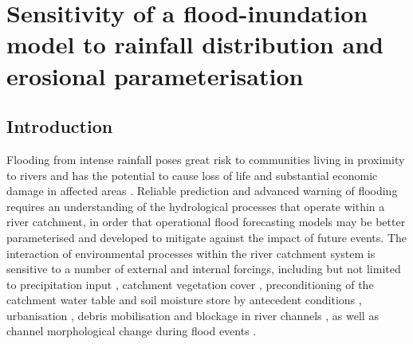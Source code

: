 \chapter{Sensitivity of a flood-inundation model to rainfall distribution and erosional parameterisation}
\label{chapter_flood_model_sensitivity}


%
%
\section{Introduction}

Flooding from intense rainfall poses great risk to communities living in proximity to rivers and has the potential to cause loss of life and substantial economic damage in affected areas \citep{pitt2008pitt}. Reliable prediction and advanced warning of flooding requires an understanding of the hydrological processes that operate within a river catchment, in order that operational flood forecasting models may be better parameterised and developed to mitigate against the impact of future events. The interaction of environmental processes within the river catchment system is sensitive to a number of external and internal forcings, including but not limited to precipitation input \citep{nicotina2008impact}, catchment vegetation cover \citep{darby1999effect,andreassian2004waters,bradshaw2007global}, preconditioning of the catchment water table and soil moisture store by antecedent conditions \citep{berthet2009crucial}, urbanisation \citep{hollis1975effect}, debris mobilisation and blockage in river channels \citep{gippel1995environmental,jeffries2003influence}, as well as channel morphological change during flood events \citep{wong2015sensitivity}. 

